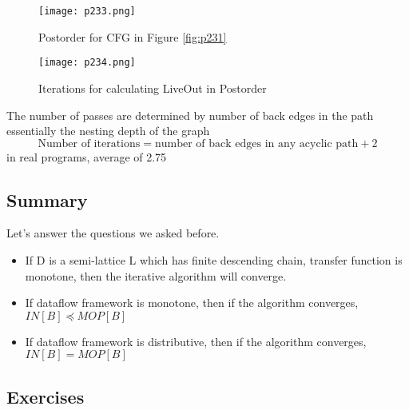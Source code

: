 \begin{figure}[H]
	\centering
	\texttt{[image: p233.png]}
	\caption{Postorder for CFG in Figure \ref{fig:p231}}
	\label{fig:p233}
\end{figure}


\begin{figure}[H]
	\centering
	\texttt{[image: p234.png]}
	\caption{Iterations for calculating LiveOut in Postorder}
	\label{fig:p234}
\end{figure}


The number of passes are determined by number of back edges in the path essentially the nesting depth of the graph
\[
	\text{Number of iterations} = \text{number of back edges in any acyclic
		path} + 2
\]
in	real	programs,	average	of	2.75


\subsection{Summary}
Let's answer the questions we asked before.
\begin{itemize}
	\item If D is a semi-lattice L which has finite descending chain, transfer function is monotone,
	      then the iterative algorithm will converge.
	\item  If dataflow framework is monotone,  then if the algorithm converges,
	      $IN[B] \preceq  MOP[B] $
	\item If dataflow framework is distributive, then if the algorithm converges,
	      $IN[B] = MOP[B]$
\end{itemize}




\subsection{Exercises}


